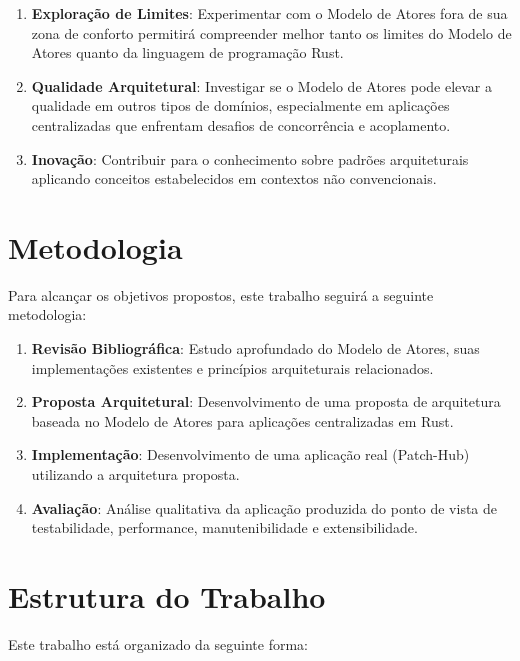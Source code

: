 \begin{enumerate}
    \item \textbf{Exploração de Limites}: Experimentar com o Modelo de Atores fora de sua zona de conforto permitirá compreender melhor tanto os limites do Modelo de Atores quanto da linguagem de programação Rust.
    
    \item \textbf{Qualidade Arquitetural}: Investigar se o Modelo de Atores pode elevar a qualidade em outros tipos de domínios, especialmente em aplicações centralizadas que enfrentam desafios de concorrência e acoplamento.
    
    \item \textbf{Inovação}: Contribuir para o conhecimento sobre padrões arquiteturais aplicando conceitos estabelecidos em contextos não convencionais.
\end{enumerate}

\section{Metodologia}

Para alcançar os objetivos propostos, este trabalho seguirá a seguinte metodologia:

\begin{enumerate}
    \item \textbf{Revisão Bibliográfica}: Estudo aprofundado do Modelo de Atores, suas implementações existentes e princípios arquiteturais relacionados.
    
    \item \textbf{Proposta Arquitetural}: Desenvolvimento de uma proposta de arquitetura baseada no Modelo de Atores para aplicações centralizadas em Rust.
    
    \item \textbf{Implementação}: Desenvolvimento de uma aplicação real (Patch-Hub) utilizando a arquitetura proposta.
    
    \item \textbf{Avaliação}: Análise qualitativa da aplicação produzida do ponto de vista de testabilidade, performance, manutenibilidade e extensibilidade.
\end{enumerate}

\section{Estrutura do Trabalho}

Este trabalho está organizado da seguinte forma:

